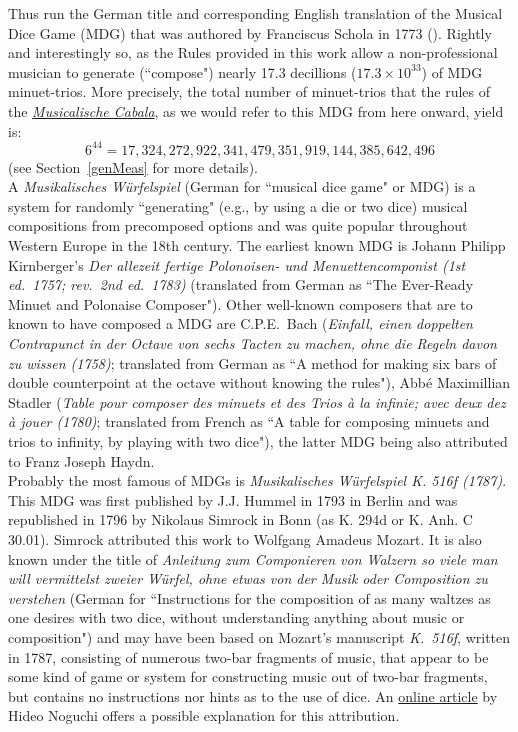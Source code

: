 \documentclass[a4paper,x11names,svgnames,10pt]{article}
\begin{document}
{Thus run the German title and corresponding English translation of the Musical Dice Game (MDG) that was authored by Franciscus Schola in 1773 (\citealp{schola1773}).  Rightly and interestingly so, as the Rules provided in this work allow a non-professional musician to generate (``compose") nearly 17.3 decillions ($17.3 \times 10^{33}$) of MDG minuet-trios.  More precisely, the total number of minuet-trios that the rules of the \href{https://imslp.org/wiki/Musicalische_Cabala_(Schola%2C_Franciscus)}{{\em Musicalische Cabala}}, as we would refer to this MDG from here onward, yield is: $$6^{44} = 17,324,272,922,341,479,351,919,144,385,642,496$$ (see Section~\ref{genMeas} for more details).\\

\noindent A {\it Musikalisches W\"{u}rfelspiel} (German for ``musical dice game" or MDG) is a system for randomly ``generating" (e.g., by using a die or two dice) musical compositions from precomposed options and was quite popular throughout Western Europe in the 18th century.  The earliest known MDG is Johann Philipp Kirnberger's {\em Der allezeit fertige Polonoisen- und Menuettencomponist (1st ed.\ 1757; rev.\ 2nd ed.\ 1783)} (translated from German as ``The Ever-Ready Minuet and Polonaise Composer").  Other well-known composers that are to known to have composed a MDG are C.P.E.\ Bach ({\em Einfall, einen doppelten Contrapunct in der Octave von sechs Tacten zu machen, ohne die Regeln davon zu wissen (1758)}; translated from German as ``A method for making six bars of double counterpoint at the octave without knowing the rules"), Abb\'{e} Maximillian Stadler ({\em Table pour composer des minuets et des Trios \`{a} la infinie; avec deux dez \`{a} jouer (1780)}; translated from French as ``A table for composing minuets and trios to infinity, by playing with two dice"), the latter MDG being also attributed to Franz Joseph Haydn.\\

Probably the most famous of MDGs is {\it Musikalisches W\"{u}rfelspiel K. 516f (1787)}.  This MDG was first published by J.J. Hummel in 1793 in Berlin and was republished in 1796 by Nikolaus Simrock in Bonn (as K. 294d or K. Anh. C 30.01). Simrock attributed this work to Wolfgang Amadeus Mozart. It is also known under the title of {\em Anleitung zum Componieren von Walzern so viele man will vermittelst zweier W\"{u}rfel, ohne etwas von der Musik oder Composition zu verstehen} (German for ``Instructions for the composition of as many waltzes as one desires with two dice, without understanding anything about music or composition") and may have been based on Mozart's manuscript {\em K.\ 516f}, written in 1787, consisting of numerous two-bar fragments of music, that appear to be some kind of game or system for constructing music out of two-bar fragments, but contains no instructions nor hints as to the use of dice.  An \href{(http://www.asahi-net.or.jp/\~rb5h-ngc/e/k516f.htm}{online article} by Hideo Noguchi offers a possible explanation for this attribution.\\

}
\end{document}
